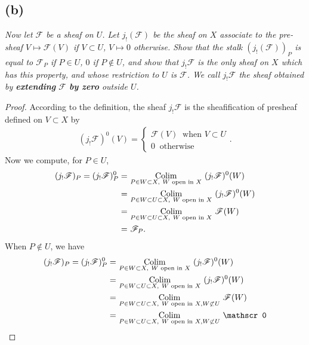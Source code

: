 \subsection{(b)}
\textit{Now let $\mathscr F$ be a sheaf on $U$. Let $j_{!}(\mathscr F)$ be the sheaf on $X$ associate to the pre-sheaf $V\mapsto \mathscr F(V)$ if $V\subset U$, $V\mapsto 0$ otherwise. Show that the stalk $(j_{!}(\mathscr F))_P$ is equal to $\mathscr F_P$ if $P\in U$, $0$ if $P\notin U$, and show that $j_{!}\mathscr F$ is the only sheaf on $X$ which has this property, and whose restriction to $U$ is $\mathscr F$. We call $j_!\mathscr F$ the sheaf obtained by \textbf{extending} $\mathscr F$ \textbf{by zero} outside $U$. }

\begin{proof}
    According to the definition, the sheaf $j_!\mathscr F$ is the sheafification of presheaf defined on $V\subset X$ by 
    \begin{align*}
        (j_!\mathscr F)^0 (V)=\begin{cases}
            \mathscr F(V) ~\text{ when } V\subset U\\
            0 ~\text{ otherwise}
        \end{cases}.
    \end{align*}
    Now we compute, for $P\in U$, 
    \begin{align*}
        (j_!\mathscr F)_P = (j_!\mathscr F)^0_P =&~ \underset{P\in W\subset X,~ W \text{ open in }X}{\operatorname{Colim}}~ (j_!\mathscr F)^0(W)\\
        =&~ \underset{P\in W\subset U\subset X,~ W \text{ open in }X}{\operatorname{Colim}}~ (j_!\mathscr F)^0(W)\\
        =&~ \underset{P\in W\subset U\subset X,~ W \text{ open in }X}{\operatorname{Colim}}~ \mathscr F(W)\\ 
        =&~ \mathscr F_P.
    \end{align*}
    When $P\notin U$, we have 
    \begin{align*}
        (j_!\mathscr F)_P = (j_!\mathscr F)^0_P =&~ \underset{P\in W\subset X,~ W \text{ open in }X}{\Colim}~ (j_!\mathscr F)^0(W)\\
        =&~ \underset{P\in W\subset U\subset X,~ W \text{ open in }X}{\Colim}~ (j_!\mathscr F)^0(W)\\
        =&~ \underset{P\in W\subset U\subset X,~ W \text{ open in }X, W\not\subset U }{\Colim}~ \mathscr F(W)\\ 
        =&~ \underset{P\in W\subset U\subset X,~ W \text{ open in }X, W\not\subset U }{\Colim}~ \mathscr 0\\  

\end{align*}
\end{proof}
